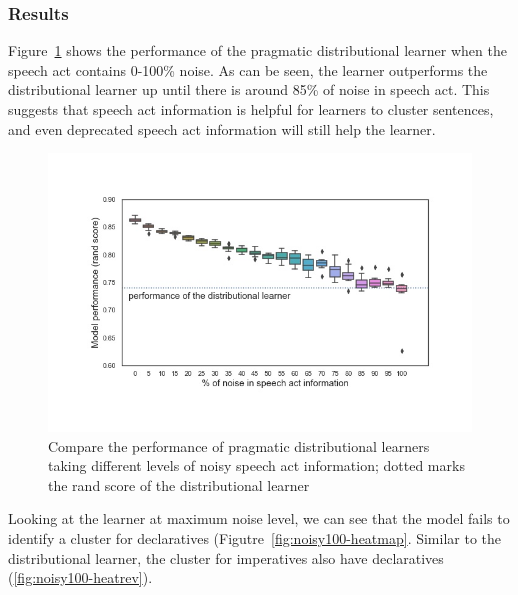 \subsubsection{Results}
\label{sec:engcl:model:noisy:results}

Figure~\ref{fig:noisy-rand-compare} shows the performance of the pragmatic distributional learner when the speech act contains 0-100\% noise. As can be seen, the learner outperforms the distributional learner up until there is around 85\% of noise in speech act. This suggests that speech act information is helpful for learners to cluster sentences, and even deprecated speech act information will still help the learner.  

\begin{figure}[H]
    \centering
    \includegraphics[width=1\textwidth]{figures/noisy-rand-compare.jpg}
    \caption{Compare the performance of pragmatic distributional learners taking different levels of noisy speech act information; dotted marks the rand score of the distributional learner}
    \label{fig:noisy-rand-compare}
\end{figure}

Looking at the learner at maximum noise level, we can see that the model fails to identify a cluster for declaratives (Figutre~\ref{fig:noisy100-heatmap}. Similar to the distributional learner, the cluster for imperatives also have declaratives (\ref{fig:noisy100-heatrev}). 



